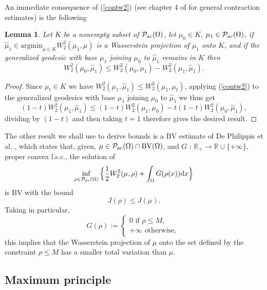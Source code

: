 \documentclass[12pt, a4paper]{article}
\numberwithin{equation}{section}
\theoremstyle{plain}
\newtheorem{lem}[thm]{Lemma}
\theoremstyle{definition}
\theoremstyle{remark}
\newcommand\PPa{{\cal P}_{\rm{ac}}(\Omega)}
\newcommand{\R}{\mathbb{R}}
\newcommand{\BV}{\mathrm{BV}}
\newcommand{\argmin}{\mathrm{argmin}}
\newcommand\pref[1]{(\ref{#1})}
\begin{document}
An immediate consequence of \pref{contw2} (see chapter 4 of \cite{ambrosio2008gradient} for general contraction estimates)  is the following

\begin{lem}\label{distcont}
Let $K$ be a nonempty subset of $\PPa$, let $\mu_0 \in K$, $\mu_1\in \PPa$, if $\hat{\mu}_1 \in \argmin_{\mu \in K} W^2_2(\mu_1, \mu)$ is a Wasserstein projection of $\mu_1$ onto $K$, and if the generalized geodesic with base $\mu_1$ joining $\mu_0$ to $\hat{\mu}_1$ remains in $K$ then
\begin{equation}
W_2^2(\mu_0, \hat{\mu}_1) \le W_2^2(\mu_0, \mu_1)- W_2^2(\mu_1, \hat{\mu}_1). 
\end{equation}
\end{lem} 
 
 
\begin{proof}
Since $\mu_t\in K$ we have $W^2_2(\mu_1, \hat{\mu}_1) \le W_2^2(\mu_1, \mu_t)$, applying  \pref{contw2} to the generalized geodesics with base $\mu_1$ joining $\mu_0$ to $\hat{\mu}_1$ we thus get
\[(1-t) W_2^2(\mu_1, \hat{\mu}_1) \le (1-t) W_2^2(\mu_1, \mu_0)-t(1-t) W_2^2(\mu_0, \hat{\mu}_1),\]
dividing by $(1-t)$ and then taking $t=1$ therefore gives the desired result. 
 
 \end{proof}
 
 
 The other result we shall use to derive bounds is a $\BV$ estimate of De Philippis et al. \cite{de2016bv}, which states that, given, $\mu \in \PPa \cap \BV(\Omega)$, and $G$ : $\R_+ \to \R\cup\{+\infty\}$, proper convex l.s.c., the solution of
 \begin{equation}\label{proxG}
 \inf_{\rho\in \PPa}  \Big \{\frac{1}{2} W_2^2(\mu, \rho)+ \int_{\Omega} G(\rho(x)) \mbox{d}x  \Big\}
 \end{equation}
 is $\BV$ with the bound
 \begin{equation}
 J(\rho) \le J(\mu).
 \end{equation}
 Taking in particular, 
 \[G(\rho):=\begin{cases} 0 \mbox{ if $\rho \le M$}, \\ + \infty \mbox{ otherwise, } \end{cases}\]
 this implies that the Wasserstein projection of $\mu$ onto the set defined by the constraint $\rho \le M$ has a smaller total variation than $\mu$.  
 
 
 
 
 \subsection{Maximum  principle}\label{subsec-max}
 
\end{document}

